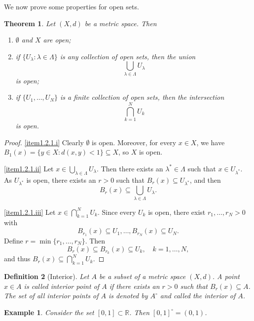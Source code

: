 \documentclass[a4paper,reqno]{amsart}
\numberwithin{equation}{section}
\newtheorem{definition}{Definition}[section]
\newtheorem{theorem}[definition]{Theorem}
\newtheorem{example}{Example}
\def\R{\mathbb{R}}
\begin{document}
We now prove some properties for open sets.

\begin{theorem} \label{thm:open}
Let $(X,d)$ be a metric space. Then
\begin{enumerate}
\item \label{item1.2.1.i} $\emptyset$ and $X$ are open;
\item \label{item1.2.1.ii} if $\{U_\lambda: \lambda \in \Lambda\}$ is any collection of open sets, then the union
\[
\bigcup_{\lambda \in \Lambda} U_\lambda
\]
is open;
\item \label{item1.2.1.iii} if $\{U_1, \ldots, U_N\}$ is a finite collection of open sets, then the intersection
\[
\bigcap_{k = 1}^N U_k
\]
is open.
\end{enumerate}
\end{theorem}

\begin{proof}
\eqref{item1.2.1.i} Clearly $\emptyset$ is open. Moreover, for every $x \in X$, we have
$B_1(x)=\{y \in X: d(x,y) < 1\} \subseteq X$, so $X$ is open.
\medskip

\eqref{item1.2.1.ii} Let $x \in \bigcup_{\lambda \in \Lambda} U_\lambda$. Then there exists an $\lambda^\ast \in \Lambda$ such
that $x \in U_{\lambda^\ast}$. As $U_{\lambda^\ast}$ is open, there exists an $r > 0$ such that $B_r(x) \subseteq U_{\lambda^\ast}$, and
then
\[
B_r(x) \subseteq \bigcup_{\lambda \in \Lambda} U_\lambda.
\]
\medskip

\eqref{item1.2.1.iii} Let $x \in \bigcap_{k = 1}^N U_k$. Since every $U_k$ is open, there exist
$r_1,\ldots,r_N > 0$ with
\[
B_{r_1}(x) \subseteq U_1, \ldots, B_{r_N}(x) \subseteq U_N.
\]
Define $r = \min\{r_1,\ldots,r_N\}$. Then
\[
B_r(x) \subseteq B_{r_k}(x) \subseteq U_k, \quad k = 1,\ldots,N,
\]
and thus $B_r(x) \subseteq \bigcap_{k = 1}^N U_k$.
\end{proof}

\begin{definition}[Interior]
Let $A$ be a subset of a metric space $(X,d)$. A point $x \in A$ is called \emph{interior point}
of $A$ if there exists an $r > 0$ such that $B_r(x) \subseteq A$.
The set of all interior points of $A$ is denoted by $A^\circ$ and called the
\emph{interior} of $A$.
\end{definition}

\begin{example}
Consider the set $[0,1] \subset \R$. Then $[0,1]^\circ = (0,1)$.
\end{example}
\end{document}
